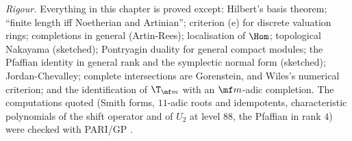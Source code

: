 \emph{Rigour.} Everything in this chapter is proved except: Hilbert's basis theorem; ``finite length iff Noetherian and Artinian''; criterion (e) for discrete valuation
rings; completions in general (Artin-Rees); localisation of $\Hom$; topological Nakayama (sketched); Pontryagin duality for general compact modules; the Pfaffian
identity in general rank and the symplectic normal form (sketched); Jordan-Chevalley; complete intersections are Gorenstein, and Wiles's numerical criterion;
and the identification of $\T_{\mf m}$ with an $\mf m$-adic completion. The computations quoted (Smith forms, $11$-adic roots and idempotents, characteristic
polynomials of the shift operator and of $U_2$ at level $88$, the Pfaffian in rank $4$) were checked with PARI/GP \cite{PARI}.
